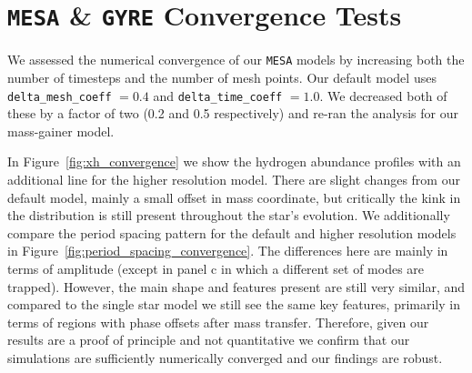 \documentclass[desactivate]{aa}
\begin{document}
\section{\texttt{MESA} \& \texttt{GYRE} Convergence Tests}\label{app:convergence_tests}

We assessed the numerical convergence of our \texttt{MESA} models by increasing both the number of timesteps and the number of mesh points. Our default model uses \texttt{delta\_mesh\_coeff} $ = 0.4$ and \texttt{delta\_time\_coeff} $ = 1.0$. We decreased both of these by a factor of two (0.2 and 0.5 respectively) and re-ran the analysis for our mass-gainer model.

In Figure~\ref{fig:xh_convergence} we show the hydrogen abundance profiles with an additional line for the higher resolution model. There are slight changes from our default model, mainly a small offset in mass coordinate, but critically the kink in the distribution is still present throughout the star's evolution. We additionally compare the period spacing pattern for the default and higher resolution models in Figure~\ref{fig:period_spacing_convergence}. The differences here are mainly in terms of amplitude (except in panel c in which a different set of modes are trapped). However, the main shape and features present are still very similar, and compared to the single star model we still see the same key features, primarily in terms of regions with phase offsets after mass transfer. Therefore, given our results are a proof of principle and not quantitative we confirm that our simulations are sufficiently numerically converged and our findings are robust.
\end{document}
